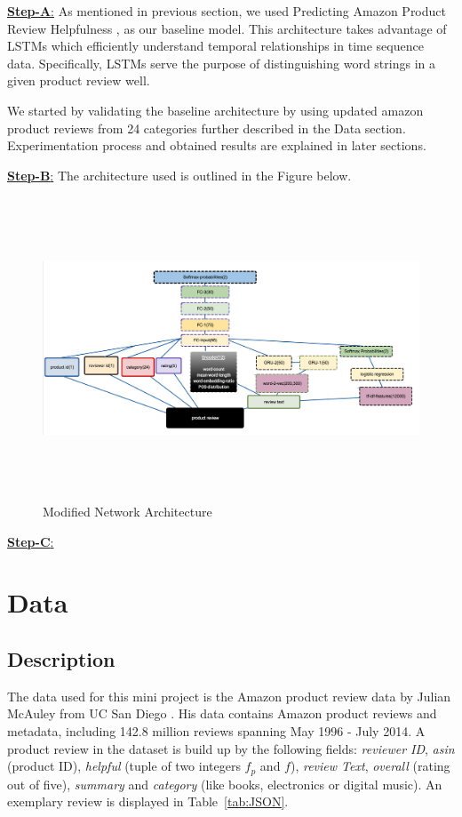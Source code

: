 \documentclass[a4paper,11pt]{article}
\begin{document}
\underline{\textbf{Step-A}:} As mentioned in previous section, we used Predicting Amazon Product Review Helpfulness \cite{wei}, as our baseline model. This architecture takes advantage of LSTMs which efficiently understand temporal relationships in time sequence data. Specifically, LSTMs serve the purpose of distinguishing word strings in a given product review well.

We started by validating the baseline architecture by using updated amazon product reviews from 24 categories\cite{McATarShiHen15} further described in the Data section. Experimentation process and obtained results are explained in later sections.

\underline{\textbf{Step-B}:} The architecture used is outlined in the Figure below.
\begin{figure}[h!]
	\centering
	\includegraphics[width=\linewidth,height=9cm]{pics/arch_good}
	\captionsetup{justification=centering,margin=2cm}
	\caption{Modified Network Architecture}
	\label{pic:distri}
\end{figure}

\underline{\textbf{Step-C}:}

\section{Data}\label{sec:data}
\subsection{Description}

The data used for this mini project is the Amazon product review data by Julian McAuley from UC San Diego \cite{McATarShiHen15}. His data contains Amazon product reviews and metadata, including 142.8 million reviews spanning May 1996 - July 2014.
A product review in the dataset is build up by the following fields: \textit{reviewer ID}, \textit{asin} (product ID), \textit{helpful} (tuple of two integers $f_p$ and $f$), \textit{review Text}, \textit{overall} (rating out of five), \textit{summary} and \textit{category} (like books, electronics or digital music).
An exemplary review is displayed in Table~\ref{tab:JSON}. 
\end{document}
